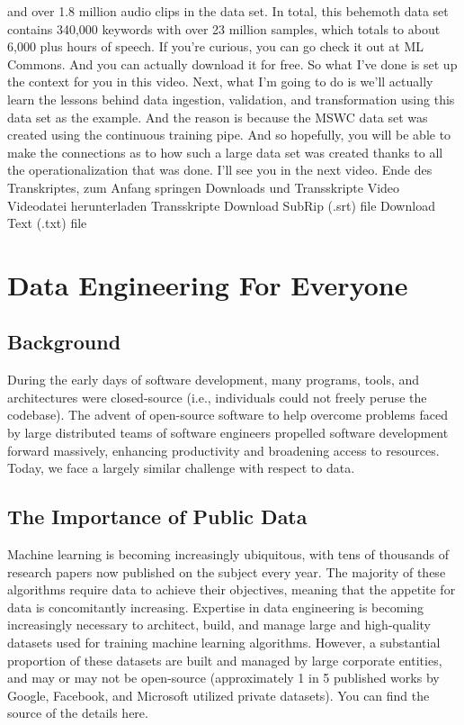 {{{{    and over 1.8 million audio clips in the data set.
    In total, this behemoth data set contains 340,000 keywords
    with over 23 million samples, which totals to about 6,000
    plus hours of speech.
    If you're curious, you can go check it out at ML Commons.
    And you can actually download it for free.
    So what I've done is set up the context for you in this video.
    Next, what I'm going to do is we'll actually
    learn the lessons behind data ingestion, validation, and transformation
    using this data set as the example.
    And the reason is because the MSWC data set was created
    using the continuous training pipe.
    And so hopefully, you will be able to make the connections as
    to how such a large data set was created thanks to all
    the operationalization that was done.
    I'll see you in the next video.
    Ende des Transkriptes, zum Anfang springen
    Downloads und Transskripte
    Video
    Videodatei herunterladen
    Transskripte
    Download SubRip (.srt) file
    Download Text (.txt) file

\section{Data Engineering For Everyone}

\subsection{Background}

    During the early days of software development, many programs, tools, and architectures were closed-source (i.e., individuals could not freely peruse the codebase). The advent of open-source software to help overcome problems faced by large distributed teams of software engineers propelled software development forward massively, enhancing productivity and broadening access to resources. Today, we face a largely similar challenge with respect to data.
    
    \subsection{The Importance of Public Data}
    
    Machine learning is becoming increasingly ubiquitous, with tens of thousands of research papers now published on the subject every year. The majority of these algorithms require data to achieve their objectives, meaning that the appetite for data is concomitantly increasing. Expertise in data engineering is becoming increasingly necessary to architect, build, and manage large and high-quality datasets used for training machine learning algorithms. However, a substantial proportion of these datasets are built and managed by large corporate entities, and may or may not be open-source (approximately 1 in 5 published works by Google, Facebook, and Microsoft utilized private datasets). You can find the source of the details here.
    
}}}}

